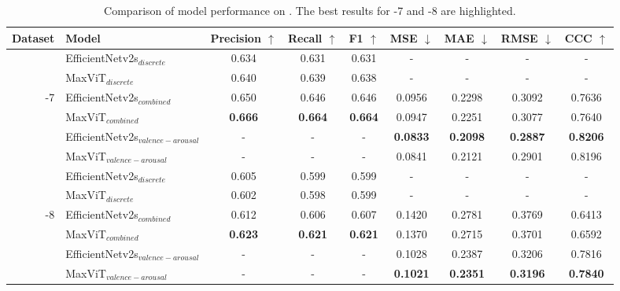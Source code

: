 \begin{table}[th]
    \begin{tabular}{r  | l | c | c | c | c | c | c |c } %
    \hline
    \textbf{Dataset}& \textbf{Model}
    & \textbf{Precision $\uparrow$} & \textbf{Recall $\uparrow$} & \textbf{F1 $\uparrow$} & \textbf{MSE $\downarrow$} & \textbf{MAE $\downarrow$} & \textbf{RMSE $\downarrow$} & \textbf{CCC $\uparrow$} \\\hline


     & EfficientNetv2s$_{discrete}$  & 0.634 & 0.631 & 0.631 & - & - & - &- \\
     & MaxViT$_{discrete}$  & 0.640 & 0.639 & 0.638 & - & - & -&- \\\cline{2-9}
       \affectnet{}-7   & EfficientNetv2s$_{combined}$ & 0.650 & 0.646 & 0.646 & 0.0956 & 0.2298 & 0.3092  & 0.7636\\
  & MaxViT$_{combined}$ & \textbf{0.666} & \textbf{0.664} & \textbf{0.664} & 0.0947 & 0.2251 & 0.3077  & 0.7640\\\cline{2-9}
    & EfficientNetv2s$_{valence-arousal}$ & - & - & - & \textbf{0.0833} & \textbf{0.2098} & \textbf{0.2887} & \textbf{0.8206} \\
    & MaxViT$_{valence-arousal}$ & - & - & - & 0.0841 & 0.2121 & 0.2901 & 0.8196 \\ \hline

     & EfficientNetv2s$_{discrete}$ & 0.605 & 0.599 & 0.599 & - & - & - &-\\
     & MaxViT$_{discrete}$ & 0.602 & 0.598 & 0.599 & - & - & - &-\\ \cline{2-9}
    \affectnet{}-8 & EfficientNetv2s$_{combined}$ & 0.612 & 0.606 & 0.607 & 0.1420 & 0.2781 & 0.3769 & 0.6413\\  
    & MaxViT$_{combined}$ & \textbf{0.623} & \textbf{0.621} & \textbf{0.621} & 0.1370 & 0.2715 & 0.3701 & 0.6592\\\cline{2-9}
      & EfficientNetv2s$_{valence-arousal}$ & - & - & - & 0.1028 & 0.2387 & 0.3206 & 0.7816\\ 
    & MaxViT$_{valence-arousal}$ & - & - & - & \textbf{0.1021} & \textbf{0.2351} & \textbf{0.3196} & \textbf{0.7840} \\
    
    \hline
    \end{tabular}
\caption{Comparison of model performance on \affectnet{}. The best results for \affectnet{}-7 and \affectnet{}-8 are highlighted.}
\label{tab:metrics}
\end{table}


